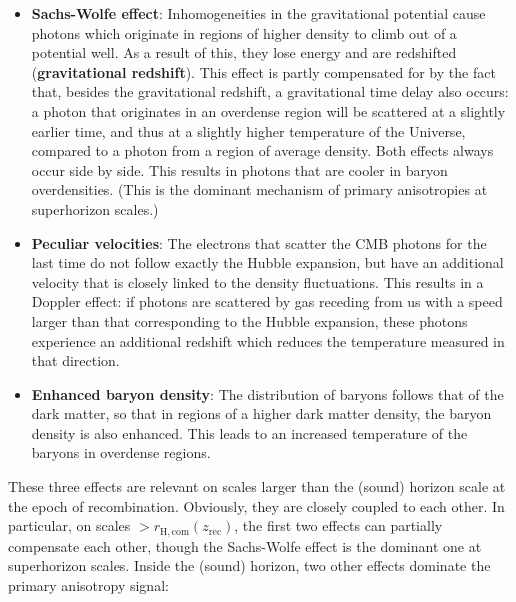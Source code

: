 \documentclass[a4paper,11pt]{article}
\begin{document}
\begin{itemize}
    \item \textbf{Sachs-Wolfe effect}: Inhomogeneities in the gravitational potential cause photons which originate in regions of higher density to climb out of a potential well. As a result of this, they lose energy and are redshifted (\textbf{gravitational redshift}). This effect is partly compensated for by the fact that, besides the gravitational redshift, a gravitational time delay also occurs: a photon that originates in an overdense region will be scattered at a slightly earlier time, and thus at a slightly higher temperature of the Universe, compared to a photon from a region of average density. Both effects always occur side by side. This results in photons that are cooler in baryon overdensities. (This is the dominant mechanism of primary anisotropies at superhorizon scales.)
    \item \textbf{Peculiar velocities}: The electrons that scatter the CMB photons for the last time do not follow exactly the Hubble expansion, but have an additional velocity that is closely linked to the density fluctuations. This results in a Doppler effect: if photons are scattered by gas receding from us with a speed larger than that corresponding to the Hubble expansion, these photons experience an additional redshift which reduces the temperature measured in that direction.
    \item \textbf{Enhanced baryon density}: The distribution of baryons follows that of the dark matter, so that in regions of a higher dark matter density, the baryon density is also enhanced. This leads to an increased temperature of the baryons in overdense regions.
\end{itemize}

{\noindent}These three effects are relevant on scales larger than the (sound) horizon scale at the epoch of recombination. Obviously, they are closely coupled to each other. In particular, on scales $>r_\mathrm{H,com}(z_\mathrm{rec})$, the first two effects can partially compensate each other, though the Sachs-Wolfe effect is the dominant one at superhorizon scales. Inside the (sound) horizon, two other effects dominate the primary anisotropy signal:
\end{document}
